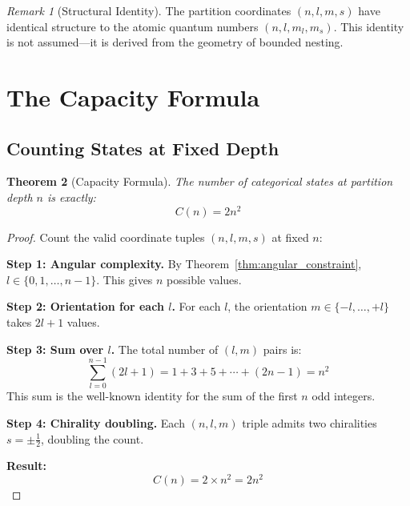 \documentclass[twocolumn,10pt,a4paper]{article}
\newtheorem{theorem}{Theorem}[section]
\theoremstyle{definition}
\theoremstyle{remark}
\newtheorem{remark}[theorem]{Remark}
\begin{document}
\begin{remark}[Structural Identity]
The partition coordinates $(n, l, m, s)$ have identical structure to the atomic quantum numbers $(n, l, m_l, m_s)$. This identity is not assumed---it is derived from the geometry of bounded nesting.
\end{remark}

\section{The Capacity Formula}
\label{sec:capacity}

\subsection{Counting States at Fixed Depth}

\begin{theorem}[Capacity Formula]
\label{thm:capacity}
The number of categorical states at partition depth $n$ is exactly:
\begin{equation}
    C(n) = 2n^2
\end{equation}
\end{theorem}

\begin{proof}
Count the valid coordinate tuples $(n, l, m, s)$ at fixed $n$:

\textbf{Step 1: Angular complexity.}
By Theorem~\ref{thm:angular_constraint}, $l \in \{0, 1, \ldots, n-1\}$. This gives $n$ possible values.

\textbf{Step 2: Orientation for each $l$.}
For each $l$, the orientation $m \in \{-l, \ldots, +l\}$ takes $2l + 1$ values.

\textbf{Step 3: Sum over $l$.}
The total number of $(l, m)$ pairs is:
\begin{equation}
    \sum_{l=0}^{n-1} (2l + 1) = 1 + 3 + 5 + \cdots + (2n-1) = n^2
\end{equation}
This sum is the well-known identity for the sum of the first $n$ odd integers.

\textbf{Step 4: Chirality doubling.}
Each $(n, l, m)$ triple admits two chiralities $s = \pm\frac{1}{2}$, doubling the count.

\textbf{Result:}
\begin{equation}
    C(n) = 2 \times n^2 = 2n^2
\end{equation}
\end{proof}
\end{document}
